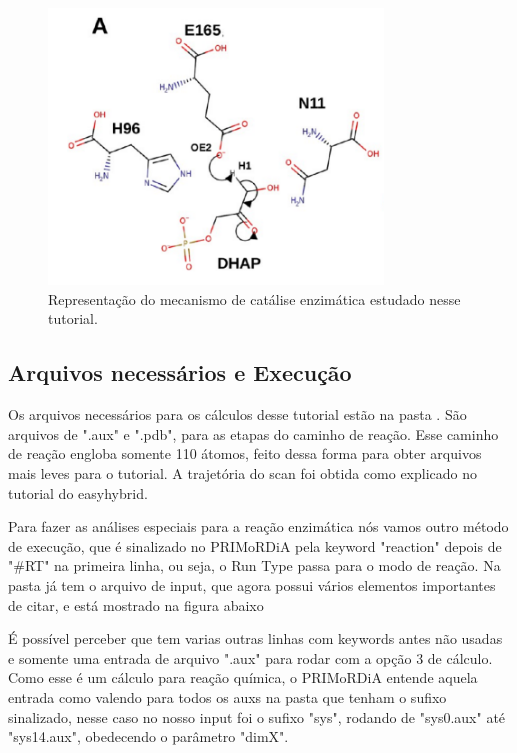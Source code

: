 \documentclass[a4paper,11pt]{refart}
\begin{document}
\hspace*{-\leftmarginwidth}
\begin{minipage}{\fullwidth}
	\begin{figure}[H]
		\begin{center}
			\includegraphics[width=3.5in]{images/tut6_img0}
			\caption{Representação do mecanismo de catálise enzimática estudado nesse tutorial.}
			\label{fig_tut6_0}
		\end{center}
	\end{figure}
\end{minipage}

\subsection{Arquivos necessários e Execução}

Os arquivos necessários para os cálculos desse tutorial estão na pasta . São arquivos de ".aux" e ".pdb", para as etapas do caminho de reação. Esse caminho de reação engloba somente 110 átomos, feito dessa forma para obter arquivos mais leves para o tutorial. A trajetória do scan foi obtida como explicado no tutorial do easyhybrid.

Para fazer as análises especiais para a reação enzimática nós vamos outro método de execução, que é sinalizado no PRIMoRDiA pela keyword "reaction" depois de "\#RT" na primeira linha, ou seja, o Run Type passa para o modo de reação. Na pasta já tem o arquivo de input, que agora possui vários elementos importantes de citar, e está mostrado na figura abaixo

É possível perceber que tem varias outras linhas com keywords antes não usadas e somente uma entrada de arquivo ".aux" para rodar com a opção 3 de cálculo. Como esse é um cálculo para reação química, o PRIMoRDiA entende aquela entrada como valendo para todos os auxs na pasta que tenham o sufixo sinalizado, nesse caso no nosso input foi o sufixo "sys", rodando de "sys0.aux" até "sys14.aux", obedecendo o parâmetro "dimX".
\end{document}
